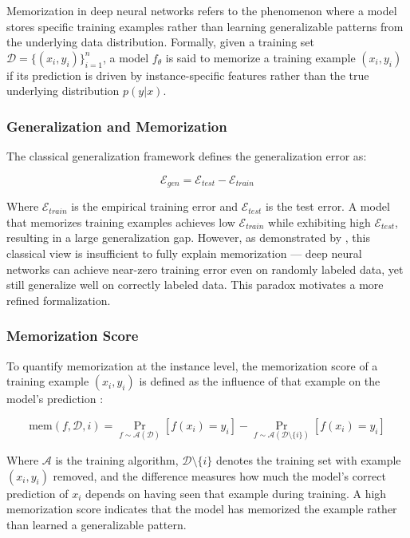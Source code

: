 
Memorization in deep neural networks refers to the phenomenon 
where a model stores specific training examples rather than 
learning generalizable patterns from the underlying data 
distribution. Formally, given a training set 
$\mathcal{D} = \{(x_i, y_i)\}_{i=1}^n$, a model $f_\theta$ 
is said to memorize a training example $(x_i, y_i)$ if its 
prediction is driven by instance-specific features rather 
than the true underlying distribution $p(y|x)$.

\subsubsection{Generalization and Memorization}

The classical generalization framework defines the 
generalization error as:

\begin{equation}
\mathcal{E}_{gen} = \mathcal{E}_{test} - \mathcal{E}_{train}
\label{eq:generror}
\end{equation}

Where $\mathcal{E}_{train}$ is the empirical training error 
and $\mathcal{E}_{test}$ is the test error. A model that 
memorizes training examples achieves low $\mathcal{E}_{train}$ 
while exhibiting high $\mathcal{E}_{test}$, resulting in a 
large generalization gap. However, as demonstrated by 
\cite{chiyuan_zhang_bd8f0549}, this classical view is insufficient 
to fully explain memorization — deep neural networks can 
achieve near-zero training error even on randomly labeled 
data, yet still generalize well on correctly labeled data. 
This paradox motivates a more refined formalization.

\subsubsection{Memorization Score}

To quantify memorization at the instance level, the 
memorization score of a training example $(x_i, y_i)$ 
is defined as the influence of that example on the 
model's prediction \cite{feldman2021doeslearningrequirememorization}:

\begin{equation}
\text{mem}(f, \mathcal{D}, i) = 
\Pr_{f \sim \mathcal{A}(\mathcal{D})}
[f(x_i) = y_i] - 
\Pr_{f \sim \mathcal{A}(\mathcal{D} \setminus \{i\})}
[f(x_i) = y_i]
\label{eq:memscore}
\end{equation}

Where $\mathcal{A}$ is the training algorithm, 
$\mathcal{D} \setminus \{i\}$ denotes the training set 
with example $(x_i,y_i)$ removed, and the difference measures 
how much the model's correct prediction of $x_i$ depends 
on having seen that example during training. A high 
memorization score indicates that the model has memorized 
the example rather than learned a generalizable pattern.

